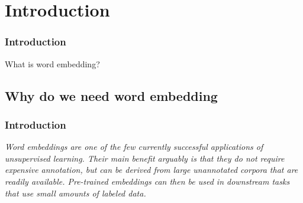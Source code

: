 %




\section{Introduction}

\begin{frame}
	\frametitle{Introduction}
	
	\begin{center}
		\Huge {What is word embedding?}
	\end{center}
\end{frame}


\subsection{Why do we need word embedding}


\begin{frame}
\frametitle{Introduction}

\begin{center}
	\textit{Word embeddings are one of the few currently successful applications of unsupervised learning. Their main benefit arguably is that they do not require expensive annotation, but can be derived from large unannotated corpora that are readily available. Pre-trained embeddings can then be used in downstream tasks that use small amounts of labeled data.}
\end{center}
\end{frame}



